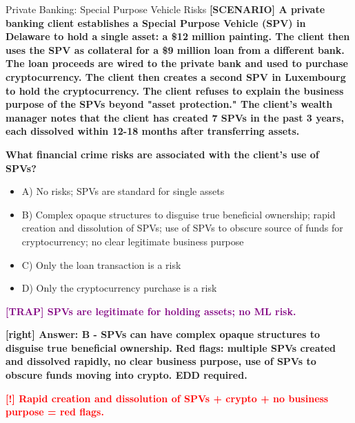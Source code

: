 \documentclass[11pt,a4paper]{beamer}
\newcommand{\redflag}[1]{\textcolor{red}{\textbf{[!] #1}}}
\newcommand{\trap}[1]{\textcolor{purple}{\textbf{[TRAP] #1}}}
\newcommand{\correct}[1]{\textcolor{green!50!black}{\textbf{[right] #1}}}
\newcommand{\scenario}[1]{\textcolor{blue!70!black}{\textbf{[SCENARIO] #1}}}
\begin{document}
	
	\begin{frame}{Private Banking: Special Purpose Vehicle Risks}
		\tiny
		\scenario{A private banking client establishes a Special Purpose Vehicle (SPV) in Delaware to hold a single asset: a \$12 million painting. The client then uses the SPV as collateral for a \$9 million loan from a different bank. The loan proceeds are wired to the private bank and used to purchase cryptocurrency. The client then creates a second SPV in Luxembourg to hold the cryptocurrency. The client refuses to explain the business purpose of the SPVs beyond "asset protection." The client's wealth manager notes that the client has created 7 SPVs in the past 3 years, each dissolved within 12-18 months after transferring assets.}
		
		\vspace{0.02cm}
		\textbf{What financial crime risks are associated with the client's use of SPVs?}
		\vspace{0.02cm}
		
		\begin{itemize}
			\item A) No risks; SPVs are standard for single assets
			\item B) Complex opaque structures to disguise true beneficial ownership; rapid creation and dissolution of SPVs; use of SPVs to obscure source of funds for cryptocurrency; no clear legitimate business purpose
			\item C) Only the loan transaction is a risk
			\item D) Only the cryptocurrency purchase is a risk
		\end{itemize}
		
		\vspace{0.02cm}
		\trap{SPVs are legitimate for holding assets; no ML risk.}
		
		\vspace{0.02cm}
		\correct{Answer: B - SPVs can have complex opaque structures to disguise true beneficial ownership. Red flags: multiple SPVs created and dissolved rapidly, no clear business purpose, use of SPVs to obscure funds moving into crypto. EDD required.}
		
		\vspace{0.02cm}
		\redflag{Rapid creation and dissolution of SPVs + crypto + no business purpose = red flags.}
	\end{frame}
	
\end{document}
